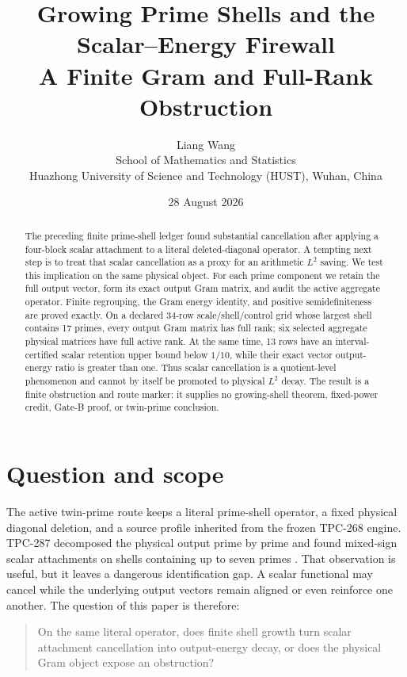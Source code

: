 \documentclass[11pt]{article}
\title{Growing Prime Shells and the Scalar--Energy Firewall\\
  A Finite Gram and Full-Rank Obstruction}
\author{Liang Wang\\
School of Mathematics and Statistics\\
Huazhong University of Science and Technology (HUST), Wuhan, China}
\date{28 August 2026}
\begin{document}
\maketitle

\begin{abstract}
The preceding finite prime-shell ledger found substantial cancellation after
applying a four-block scalar attachment to a literal deleted-diagonal
operator.  A tempting next step is to treat that scalar cancellation as a
proxy for an arithmetic $L^2$ saving.  We test this implication on the same
physical object.  For each prime component we retain the full output vector,
form its exact output Gram matrix, and audit the active aggregate operator.
Finite regrouping, the Gram energy identity, and positive semidefiniteness
are proved exactly.  On a declared 34-row scale/shell/control grid whose
largest shell contains 17 primes, every output Gram matrix has full rank; six
selected aggregate physical matrices have full active rank.  At the same time,
13 rows have an interval-certified scalar retention upper bound below
$1/10$, while their exact vector output-energy ratio is greater than one.
Thus scalar cancellation is a quotient-level phenomenon and cannot by itself
be promoted to physical $L^2$ decay.  The result is a finite obstruction and
route marker: it supplies no growing-shell theorem, fixed-power credit,
Gate-B proof, or twin-prime conclusion.
\end{abstract}

\section{Question and scope}

The active twin-prime route keeps a literal prime-shell operator, a fixed
physical diagonal deletion, and a source profile inherited from the frozen
TPC-268 engine.  TPC-287 decomposed the physical output prime by prime and
found mixed-sign scalar attachments on shells containing up to seven primes
\cite{tpc287}.  That observation is useful, but it leaves a dangerous
identification gap.  A scalar functional may cancel while the underlying
output vectors remain aligned or even reinforce one another.  The question of
this paper is therefore:

\begin{quote}
On the same literal operator, does finite shell growth turn scalar
attachment cancellation into output-energy decay, or does the physical Gram
object expose an obstruction?
\end{quote}
\end{document}

